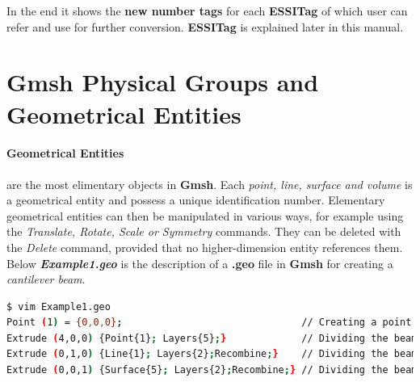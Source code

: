 \documentclass[11pt]{article}
\begin{document}
In the end it shows the \textbf{new number tags} for each \textbf{ESSITag} of
which user can refer and use for further conversion. \textbf{ESSITag} is
explained later in this manual.

\section{Gmsh Physical Groups and Geometrical Entities}

\paragraph{Geometrical Entities} are the most elimentary objects in \textbf{Gmsh}. 
Each \textit{point, line, surface and volume} is a geometrical entity and possess 
a unique identification number. Elementary geometrical entities can then be 
manipulated in various ways, for example using the 
\textit{Translate, Rotate, Scale or Symmetry} commands. 
They can be deleted with the \textit{Delete} command, provided that no 
higher-dimension entity references them. 
Below \textbf{\textit{Example1.geo}} is the description of a \textbf{.geo} 
file in \textbf{Gmsh} for creating a \textit{cantilever beam}.

\begin{lstlisting}[language=bash,backgroundcolor=\color{grayish}]
$ vim Example1.geo 
Point (1) = {0,0,0};                               // Creating a point
Extrude (4,0,0) {Point{1}; Layers{5};}             // Dividing the beam length in 5 parts 
Extrude (0,1,0) {Line{1}; Layers{2};Recombine;}    // Dividing the beam width in 2 parts
Extrude (0,0,1) {Surface{5}; Layers{2};Recombine;} // Dividing the beam depth in 2 parts
\end{lstlisting}
\end{document}

